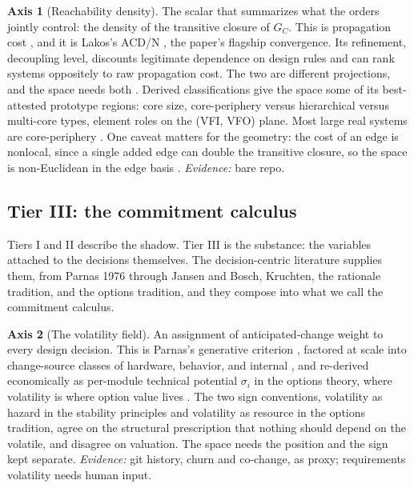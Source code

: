 \documentclass[11pt,oneside]{article}
\theoremstyle{definition}
\newtheorem{axis}{Axis}
\begin{document}
\begin{axis}[Reachability density]\label{ax:reach}
The scalar that summarizes what the orders jointly control: the density of the transitive
closure of $G_C$. This is propagation cost \cite{maccormack2006}, and it is Lakos's ACD/N
\cite{lakos1996}, the paper's flagship convergence. Its refinement, decoupling level, discounts
legitimate dependence on design rules and can rank systems oppositely to raw propagation cost.
The two are different projections, and the space needs both \cite{mo2016}. Derived
classifications give the space some of its best-attested prototype regions: core size,
core-periphery versus hierarchical versus multi-core types, element roles on the (VFI, VFO)
plane. Most large real systems are core-periphery \cite{baldwin2014}. One caveat matters for the
geometry: the cost of an edge is nonlocal, since a single added edge can double the transitive
closure, so the space is non-Euclidean in the edge basis \cite{lakos1996}. \emph{Evidence:}
bare repo.
\end{axis}

\subsection{Tier III: the commitment calculus}\label{sec:commitment}

Tiers I and II describe the shadow. Tier III is the substance: the variables attached to the
decisions themselves. The decision-centric literature supplies them, from Parnas 1976 through
Jansen and Bosch, Kruchten, the rationale tradition, and the options tradition, and they compose
into what we call the commitment calculus.

\begin{axis}[The volatility field]\label{ax:volatility}
An assignment of anticipated-change weight to every design decision. This is Parnas's generative
criterion \cite{parnas1972}, factored at scale into change-source classes of hardware, behavior,
and internal \cite{parnas1985}, and re-derived economically as per-module technical potential
$\sigma_i$ in the options theory, where volatility is where option value lives
\cite{baldwinclark2000,sullivan2001}. The two sign conventions, volatility as hazard in the
stability principles and volatility as resource in the options tradition, agree on the
structural prescription that nothing should depend on the volatile, and disagree on valuation.
The space needs the position and the sign kept separate. \emph{Evidence:} git history, churn and
co-change, as proxy; requirements volatility needs human input.
\end{axis}
\end{document}

